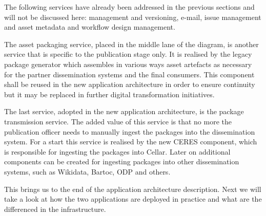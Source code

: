 	The following services have already been addressed in the previous sections and will not be discussed here: management and versioning, e-mail, issue management and asset metadata and workflow design management. 
	
	The asset packaging service, placed in the middle lane of the diagram, is another service that is specific to the publication stage only. It is realised by the legacy package generator which assembles in various ways asset artefacts as necessary for the partner dissemination systems and the final consumers. This component shall be reused in the new application architecture in order to ensure continuity but it may be replaced in further digital transformation initiatives. 
	
	The last service, adopted in the new application architecture, is the package transmission service. The added value of this service is that no more the publication officer needs to manually ingest the packages into the dissemination system. For a start this service is realised by the new CERES component, which is responsible for ingesting the packages into Cellar. Later on additional components can be created for ingesting packages into other dissemination systems, such as Wikidata, Bartoc, ODP and others. 
	
	This brings us to the end of the application architecture description. Next we will take a look at how the two applications are deployed in practice and what are the differenced in the infrastructure.